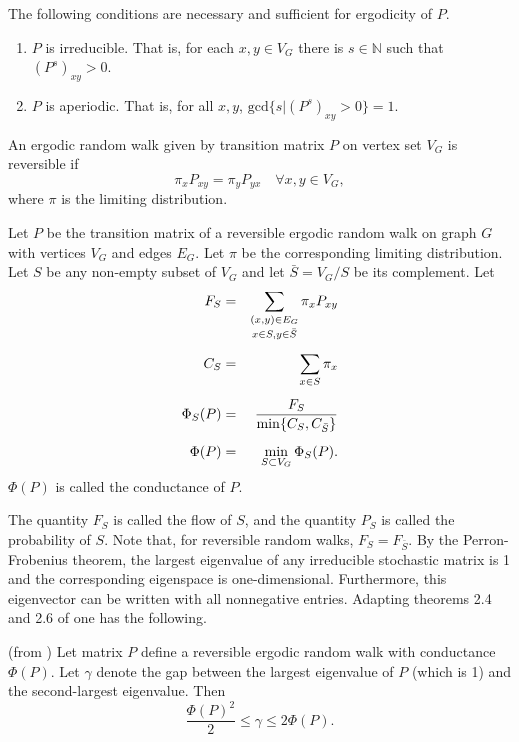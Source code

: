 \begin{lem}
\label{ergodicity}
The following conditions are necessary and sufficient for ergodicity
of $P$.
\begin{enumerate}
\item $P$ is irreducible. That is, for each $x,y \in V_G$ there is $s
  \in \mathbb{N}$ such that $\left( P^s \right)_{xy} > 0$.
\item $P$ is aperiodic. That is, for all $x,y$, $\mathrm{gcd} \{ s|
  (P^s)_{xy} > 0 \} = 1$.
\end{enumerate}
\end{lem}

\begin{definition}
An ergodic random walk given by transition matrix $P$ on vertex set
$V_G$ is reversible if
\begin{equation}
\pi_x P_{xy} =  \pi_y P_{yx} \quad \forall x,y \in V_G,
\end{equation}
where $\pi$ is the limiting distribution.
\end{definition}

\begin{definition}
Let $P$ be the transition matrix of a reversible ergodic random walk
on graph $G$ with vertices $V_G$ and edges $E_G$. Let $\pi$ be the
corresponding limiting distribution. Let $S$ be any non-empty subset
of $V_G$ and let $\bar{S} = V_G/S$ be its complement. Let
\begin{eqnarray}
F_S & = & \mathop{\sum_{(x,y) \in E_G}}_{x \in S, y \in \bar{S}} \pi_x
P_{xy} \vspace{30pt} \\[5pt]
C_S & = & \sum_{x \in S} \pi_x \\[5pt]
\Phi_S(P) & = & \frac{F_S}{\min\{C_S, C_{\bar{S}}\}} \\[5pt]
\Phi(P) & = & \min_{S \subset V_G} \Phi_S(P).
\end{eqnarray}
$\Phi(P)$ is called the conductance of $P$.
\end{definition}

The quantity $F_S$ is called the flow of $S$, and the quantity $P_S$
is called the probability of $S$. Note that, for reversible random
walks, $F_S = F_{\bar{S}}$. By the Perron-Frobenius theorem, the
largest eigenvalue of any irreducible stochastic matrix is 1 and the
corresponding eigenspace is one-dimensional. Furthermore, this
eigenvector can be written with all nonnegative entries. Adapting
theorems 2.4 and 2.6 of \cite{Sinclair} one has the following.

\begin{lem}
\label{conductance}(from \cite{Sinclair})
Let matrix $P$ define a reversible ergodic random walk with
conductance $\Phi(P)$. Let $\gamma$ denote the gap between the largest
eigenvalue of $P$ (which is 1) and the second-largest eigenvalue. Then
\begin{equation}
\frac{\Phi(P)^2}{2} \leq \gamma \leq 2 \Phi(P).
\end{equation}
\end{lem}

